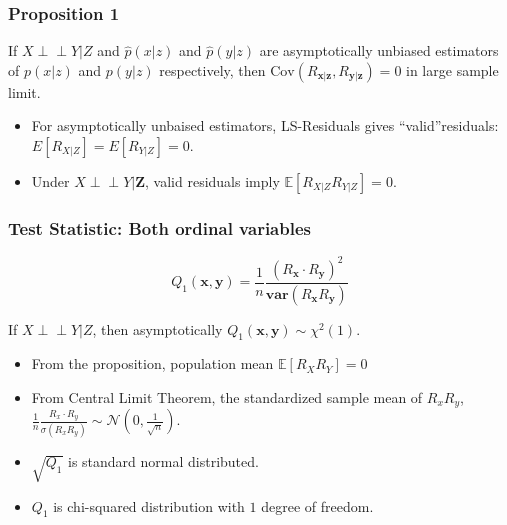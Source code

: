 \documentclass{beamer}
\def\ci{\perp\!\!\!\!\!\perp}
\begin{document}
\begin{frame}
	\frametitle{Proposition 1}
	If $ X \ci Y | Z $ and $ \hat{p}(x|z) $ and $ \hat{p}(y|z) $ are asymptotically
	unbiased estimators of $ p(x|z) $ and $ p(y|z) $ respectively, then 
	$ \mathrm{Cov}(R_{\bm{x}|\bm{z}}, R_{\bm{y}|\bm{z}}) = 0 $ in large sample limit.	
	\vspace{1em}

	\begin{itemize}
		\setlength\itemsep{1em}
		\item For asymptotically unbaised estimators, LS-Residuals
			gives ``valid''residuals: $ E[R_{X|Z}] = E[R_{Y|Z}] = 0
			$.
		\item Under $ X \ci Y | \bm{Z} $, valid
			residuals imply $ \mathbb{E}[R_{X|Z} R_{Y|Z}] = 0 $.
	\end{itemize}
\end{frame}

\begin{frame}
	\frametitle{Test Statistic: Both ordinal variables}
	$$ Q_1(\bm{x}, \bm{y}) = \frac{1}{n} \frac{(R_{\bm{x}} \cdot R_{\bm{y}})^2}{\bm{var}(R_{\bm{x}} R_{\bm{y}})} $$

	If $ X \ci Y | Z $, then asymptotically $ Q_1(\bm{x}, \bm{y}) \sim \chi^2(1) $.

	\begin{itemize}
		\setlength\itemsep{1em}
		\item From the proposition, population mean $ \mathbb{E}[R_X R_Y] = 0 $
		\item From Central Limit Theorem, the standardized sample mean of $ R_x R_y $, $ \frac{1}{n} \frac{R_x \cdot R_y}{\sigma(R_xR_y)} \sim \mathcal{N}(0, \frac{1}{\sqrt{n}}) $.
		\item $ \sqrt{Q_1} $ is standard normal distributed.
		\item $ Q_1 $ is chi-squared distribution with $ 1 $ degree of freedom.
	\end{itemize}
\end{frame}
\end{document}
